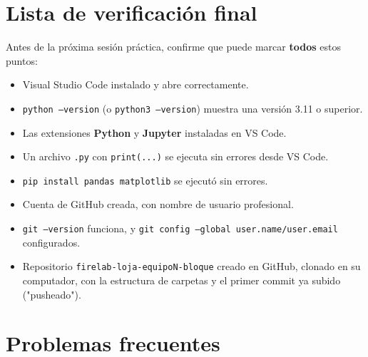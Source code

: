 \documentclass[11pt,a4paper]{article}
\newcommand{\code}[1]{\texttt{#1}}
\begin{document}
\section{Lista de verificación final}

Antes de la próxima sesión práctica, confirme que puede marcar \textbf{todos} estos puntos:

\begin{itemize}[label=$\square$]
  \item Visual Studio Code instalado y abre correctamente.
  \item \code{python --version} (o \code{python3 --version}) muestra una versión 3.11 o superior.
  \item Las extensiones \textbf{Python} y \textbf{Jupyter} instaladas en VS Code.
  \item Un archivo \code{.py} con \code{print(...)} se ejecuta sin errores desde VS Code.
  \item \code{pip install pandas matplotlib} se ejecutó sin errores.
  \item Cuenta de GitHub creada, con nombre de usuario profesional.
  \item \code{git --version} funciona, y \code{git config --global user.name/user.email} configurados.
  \item Repositorio \code{firelab-loja-equipoN-bloque} creado en GitHub, clonado en su computador, con la estructura de carpetas y el primer commit ya subido ("pusheado").
\end{itemize}

\section{Problemas frecuentes}
\end{document}

